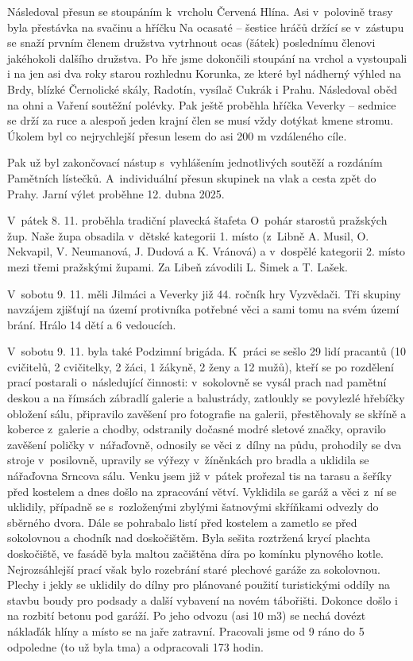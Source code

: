 \documentclass[11pt]{article}
\begin{document}
Následoval přesun se stoupáním k~vrcholu Červená Hlína. Asi v~polovině trasy byla přestávka na svačinu a hříčku Na ocasaté – šestice hráčů držící se v~zástupu se snaží prvním členem družstva vytrhnout ocas (šátek) poslednímu členovi jakéhokoli dalšího družstva. Po hře jsme dokončili stoupání na vrchol a vystoupali i na jen asi dva roky starou rozhlednu Korunka, ze které byl nádherný výhled na Brdy, blízké Černolické skály, Radotín, vysílač Cukrák i Prahu. Následoval oběd na ohni a Vaření soutěžní polévky. Pak ještě proběhla hříčka Veverky – sedmice se drží za ruce a alespoň jeden krajní člen se musí vždy dotýkat kmene stromu. Úkolem byl co nejrychlejší přesun lesem do asi 200 m vzdáleného cíle.

Pak už byl zakončovací nástup s~vyhlášením jednotlivých soutěží a rozdáním Pamětních lístečků. A~individuální přesun skupinek na vlak a cesta zpět do Prahy. Jarní výlet proběhne 12. dubna 2025.

V~pátek 8. 11. proběhla tradiční plavecká štafeta O~pohár starostů pražských žup. Naše župa obsadila v~dětské kategorii 1. místo (z~Libně A. Musil, O. Nekvapil, V. Neumanová, J. Dudová a K. Vránová) a v~dospělé kategorii 2. místo mezi třemi pražskými župami. Za Libeň závodili L. Šimek a T. Lašek. 

V~sobotu 9. 11. měli Jilmáci a Veverky již 44. ročník hry Vyzvědači. Tři skupiny navzájem zjišťují na území protivníka potřebné věci a sami tomu na svém území brání. Hrálo 14 dětí a 6 vedoucích.

V~sobotu 9. 11. byla také Podzimní brigáda. K~práci se sešlo 29 lidí pracantů (10 cvičitelů, 2 cvičitelky, 2 žáci, 1 žákyně, 2 ženy a 12 mužů), kteří se po rozdělení prací postarali o~následující činnosti: v~sokolovně se vysál prach nad pamětní deskou a na římsách zábradlí galerie a balustrády, zatloukly se povylezlé hřebíčky obložení sálu, připravilo zavěšení pro fotografie na galerii, přestěhovaly se skříně a koberce z~galerie a chodby, odstranily dočasné modré sletové značky, opravilo zavěšení poličky v~nářaďovně, odnosily se věci z~dílny na půdu, prohodily se dva stroje v~posilovně, upravily se výřezy v~žíněnkách pro bradla a uklidila se nářaďovna Srncova sálu. 
Venku jsem již v~pátek prořezal tis na tarasu a šeříky před kostelem a dnes došlo na zpracování větví. Vyklidila se garáž a věci z~ní se uklidily, případně se s~rozloženými zbylými šatnovými skříňkami odvezly do sběrného dvora. Dále se pohrabalo listí před kostelem a zametlo se před sokolovnou a chodník nad doskočištěm. Byla sešita roztržená krycí plachta doskočiště, ve fasádě byla maltou začištěna díra po komínku plynového kotle. Nejrozsáhlejší prací však bylo rozebrání staré plechové garáže za sokolovnou. Plechy i jekly se uklidily do dílny pro plánované použití turistickými oddíly na stavbu boudy pro podsady a další vybavení na novém tábořišti. Dokonce došlo i na rozbití betonu pod garáží. Po jeho odvozu (asi 10 m3) se nechá dovézt náklaďák hlíny a místo se na jaře zatravní.
Pracovali jsme od 9 ráno do 5 odpoledne (to už byla tma) a odpracovali 173 hodin.
\end{document}
